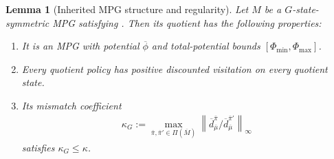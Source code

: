 \documentclass{article}
\theoremstyle{plain}
\newtheorem{lemma}[theorem]{Lemma}
\theoremstyle{definition}
\theoremstyle{remark}
\newcommand{\norm}[1]{\left\lVert#1\right\rVert}
\newcommand{\quotient}[1]{\overline{#1}}
\newcommand{\dbar}{\overline{d}}
\newcommand{\Mbar}{\kappa_G}
\begin{document}
\begin{lemma}[Inherited MPG structure and regularity]
\label{lemma:quotient-is-mpg}
Let $M$ be a $G$-state-symmetric MPG satisfying
. Then its quotient has the
following properties:
\begin{enumerate}[label=(\alph*),leftmargin=2.2em,itemsep=2pt]
  \item \label{item:quotient-potential}
  It is an MPG with potential $\quotient\phi$ and total-potential bounds
  $[\Phi_{\min},\Phi_{\max}]$.
  \item \label{item:quotient-visitation}
  Every quotient policy has positive discounted visitation on every quotient
  state.
  \item \label{item:quotient-mismatch}
  Its mismatch coefficient
  \begin{align*}
    \Mbar
    :=
    \max_{\bar\pi,\bar\pi'\in\Pi(\quotient M)}
    \norm{
      \dbar^{\bar\pi}_{\quotient\mu}
      /
      \dbar^{\bar\pi'}_{\quotient\mu}
    }_\infty
  \end{align*}
  satisfies $\Mbar\le\kappa$.
\end{enumerate}
\end{lemma}
\end{document}
